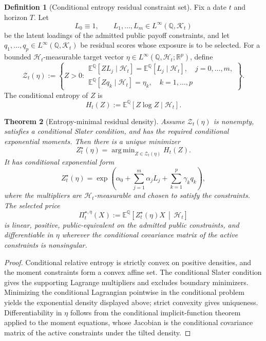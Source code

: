 \documentclass[11pt,a4paper]{amsart}
\theoremstyle{plain}
\newtheorem{theorem}{Theorem}[section]
\theoremstyle{definition}
\newtheorem{definition}[theorem]{Definition}
\theoremstyle{remark}
\DeclareMathOperator{\argmin}{arg\,min}
\newcommand{\R}{\mathbb{R}}
\newcommand{\QQ}{\mathbb{Q}}
\newcommand{\EE}{\mathbb{E}}
\newcommand{\cH}{\mathcal{H}}
\newcommand{\cK}{\mathcal{K}}
\newcommand{\cZ}{\mathcal{Z}}
\begin{document}
\begin{definition}[Conditional entropy residual constraint set]\label{def:entropy-residual-set}
Fix a date \(t\) and horizon \(T\).  Let
\[
        L_0\equiv1,\qquad L_1,\dots,L_m\in L^\infty(\QQ,\cK_t)
\]
be the latent loadings of the admitted public payoff constraints, and let
\(q_1,\dots,q_p\in L^\infty(\QQ,\cK_t)\) be residual scores whose exposure is to be selected.
For a bounded \(\cH_t\)-measurable target vector
\(\eta\in L^\infty(\QQ,\cH_t;\R^p)\), define
\[
        \cZ_t(\eta)
        :=
        \left\{
        Z>0:
        \begin{array}{l}
        \EE^\QQ[ZL_j\mid\cH_t]=\EE^\QQ[L_j\mid\cH_t],\quad j=0,\dots,m,\\
        \EE^\QQ[Zq_k\mid\cH_t]=\eta_k,\quad k=1,\dots,p
        \end{array}
        \right\}.
\]
The conditional entropy of \(Z\) is
\[
        H_t(Z):=\EE^\QQ[Z\log Z\mid\cH_t].
\]
\end{definition}

\begin{theorem}[Entropy-minimal residual density]\label{thm:entropy-minimal-density}
Assume \(\cZ_t(\eta)\) is nonempty, satisfies a conditional Slater condition, and has the
required conditional exponential moments.  Then there is a unique minimizer
\[
        Z_t^\star(\eta)
        =
        \argmin_{Z\in\cZ_t(\eta)}H_t(Z).
\]
It has conditional exponential form
\[
        Z_t^\star(\eta)
        =
        \exp\!\left(
        \alpha_0+\sum_{j=1}^m\alpha_jL_j+\sum_{k=1}^p\gamma_kq_k
        \right),
\]
where the multipliers are \(\cH_t\)-measurable and chosen to satisfy the constraints.  The
selected price
\[
        \Pi_t^{\star,\eta}(X)
        :=
        \EE^\QQ\!\left[
        Z_t^\star(\eta)X
        \,\middle|\,\cH_t
        \right]
\]
is linear, positive, public-equivalent on the admitted public constraints, and differentiable in
\(\eta\) wherever the conditional covariance matrix of the active constraints is nonsingular.
\end{theorem}

\begin{proof}
Conditional relative entropy is strictly convex on positive densities, and the moment constraints
form a convex affine set.  The conditional Slater condition gives the supporting Lagrange
multipliers and excludes boundary minimizers.  Minimizing the conditional Lagrangian pointwise in
the conditional problem yields the exponential density displayed above; strict convexity gives
uniqueness.  Differentiability in \(\eta\) follows from the conditional implicit-function theorem
applied to the moment equations, whose Jacobian is the conditional covariance matrix of the active
constraints under the tilted density.
\end{proof}
\end{document}
